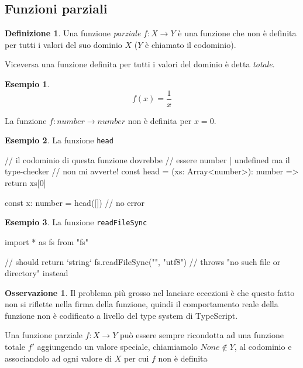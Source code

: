 \documentclass[12pt]{article}
\theoremstyle{definition}
\newtheorem{definition}{Definizione}[section]
\newtheorem{example}{Esempio}[subsection]
\newtheorem{observation}{Osservazione}[subsection]
\newenvironment{code}
  {\vspace{0.5cm} \VerbatimEnvironment\begin{typescriptcode}}
  {\end{typescriptcode} \vspace{0.2cm}}
\begin{document}
\subsection{Funzioni parziali}

\begin{definition}
Una funzione \emph{parziale} $f: X \rightarrow Y$ è una funzione che non è definita per tutti i valori del suo dominio $X$
($Y$ è chiamato il codominio).
\end{definition}

Viceversa una funzione definita per tutti i valori del dominio è detta \emph{totale}.

\begin{example}
$$
f(x) = \frac{1}{x}
$$
\end{example}

La funzione $f: number \rightarrow number$ non è definita per $x = 0$.

\begin{example}
La funzione \texttt{head}

\begin{code}
// il codominio di questa funzione dovrebbe
// essere number | undefined ma il type-checker
// non mi avverte!
const head = (xs: Array<number>): number => {
  return xs[0]
}

const x: number = head([]) // no error
\end{code}
\end{example}

\begin{example}
La funzione \texttt{readFileSync}

\begin{code}
import * as fs from "fs"

// should return `string`
fs.readFileSync("", "utf8")
// throws "no such file or directory" instead
\end{code}
\end{example}

\begin{observation}
Il problema più grosso nel lanciare eccezioni è che questo fatto non si riflette nella firma della funzione,
quindi il comportamento reale della funzione non è codificato a livello del type system di TypeScript.
\end{observation}

Una funzione parziale $f: X \rightarrow Y$ può essere sempre ricondotta ad una funzione totale $f'$ aggiungendo un valore speciale,
chiamiamolo $None \notin Y$, al codominio e associandolo ad ogni valore di $X$ per cui $f$ non è definita
\end{document}
